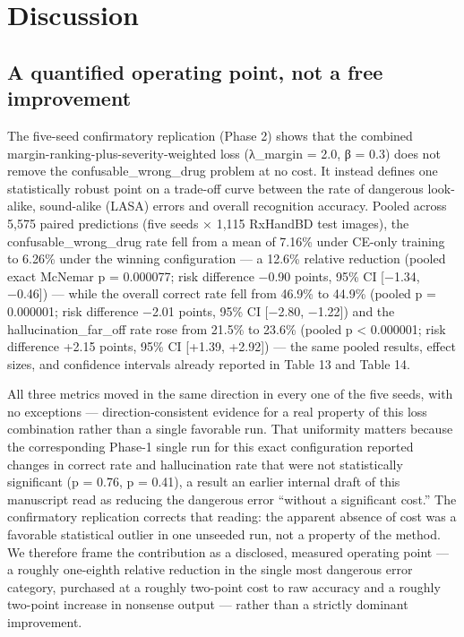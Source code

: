 \documentclass[fleqn,10pt]{wlpeerj}
\begin{document}
\section*{Discussion}\label{sec:discussion}

\subsection*{A quantified operating point, not a free improvement}\label{sec:disc-quantified}

The five-seed confirmatory replication (Phase 2) shows that the combined margin-ranking-plus-severity-weighted loss (λ\_margin = 2.0, β = 0.3) does not remove the confusable\_wrong\_drug problem at no cost. It instead defines one statistically robust point on a trade-off curve between the rate of dangerous look-alike, sound-alike (LASA) errors and overall recognition accuracy. Pooled across 5,575 paired predictions (five seeds × 1,115 RxHandBD test images), the confusable\_wrong\_drug rate fell from a mean of 7.16\% under CE-only training to 6.26\% under the winning configuration --- a 12.6\% relative reduction (pooled exact McNemar p = 0.000077; risk difference −0.90 points, 95\% CI [−1.34, −0.46]) --- while the overall correct rate fell from 46.9\% to 44.9\% (pooled p = 0.000001; risk difference −2.01 points, 95\% CI [−2.80, −1.22]) and the hallucination\_far\_off rate rose from 21.5\% to 23.6\% (pooled p \textless{} 0.000001; risk difference +2.15 points, 95\% CI [+1.39, +2.92]) --- the same pooled results, effect sizes, and confidence intervals already reported in Table 13 and Table 14.

All three metrics moved in the same direction in every one of the five seeds, with no exceptions --- direction-consistent evidence for a real property of this loss combination rather than a single favorable run. That uniformity matters because the corresponding Phase-1 single run for this exact configuration reported changes in correct rate and hallucination rate that were not statistically significant (p = 0.76, p = 0.41), a result an earlier internal draft of this manuscript read as reducing the dangerous error ``without a significant cost.'' The confirmatory replication corrects that reading: the apparent absence of cost was a favorable statistical outlier in one unseeded run, not a property of the method. We therefore frame the contribution as a disclosed, measured operating point --- a roughly one-eighth relative reduction in the single most dangerous error category, purchased at a roughly two-point cost to raw accuracy and a roughly two-point increase in nonsense output --- rather than a strictly dominant improvement.
\end{document}
